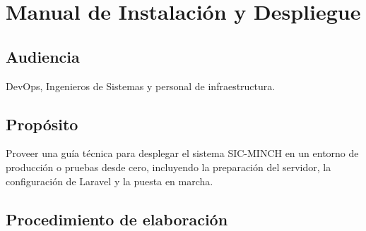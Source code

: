 \documentclass[stu]{apa7}
\begin{document}
\newpage

\section{Manual de Instalación y Despliegue}

\subsection{Audiencia}

DevOps, Ingenieros de Sistemas y personal de infraestructura.

\subsection{Propósito}

Proveer una guía técnica para desplegar el sistema SIC-MINCH en un entorno de producción o pruebas desde cero, incluyendo la preparación del servidor, la configuración de Laravel y la puesta en marcha.

\subsection{Procedimiento de elaboración}
\end{document}
